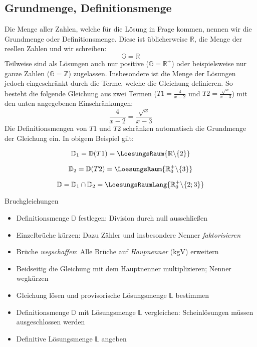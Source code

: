   
  \subsection{Grundmenge, Definitionsmenge}
  Die Menge aller Zahlen, welche für die Lösung in Frage kommen,
  nennen wir die Grundmenge oder Definitionsmenge. Diese ist üblicherweise $\mathbb{R}$, die
  Menge der reellen Zahlen und wir schreiben:
  $$\mathbb{G}=\mathbb{R}$$
  Teilweise sind als Lösungen auch nur positive ($\mathbb{G}=\mathbb{R}^+$) oder
  beispielsweise nur ganze Zahlen ($\mathbb{G}=\mathbb{Z}$)
  zugelassen.
  Insbesondere ist die Menge der Lösungen jedoch eingeschränkt durch
  die Terme, welche die Gleichung definieren. So besteht die folgende
  Gleichung aus zwei Termen ($T1=\frac{4}{x-2}$ und $T2=\frac{\sqrt{x}}{x-3}$) mit den unten angegebenen
  Einschränkungen:
  $$\frac{4}{x-2}=\frac{\sqrt{x}}{x-3}$$
  Die Definitionsmengen von $T1$ und $T2$ schränken automatisch die
  Grundmenge der Gleichung ein. In obigem Beispiel gilt:
  
  $$\mathbb{D}_1=\mathbb{D}(T1)=\LoesungsRaum{\mathbb{R}\backslash\{2\}}$$

  $$\mathbb{D}_2=\mathbb{D}(T2)=\LoesungsRaum{\mathbb{R}^+_0\backslash\{3\}}$$

  $$\mathbb{D}=\mathbb{D}_1\cap\mathbb{D}_2=\LoesungsRaumLang{\mathbb{R}^{+}_{0}\backslash\{2;3\}}$$

  \newpage
  
\begin{rezept}{Bruchgleichungen}{}
  \begin{itemize}
    \item Definitionsmenge $\mathbb{D}$ festlegen: Division durch null ausschließen
  \item Einzelbrüche kürzen: Dazu Zähler und insbesondere Nenner \textit{faktorisieren}
  \item Brüche \textit{wegschaffen}: Alle Brüche auf
    \textit{Haupnenner} (kgV) erweitern
  \item Beidseitig die Gleichung mit dem Hauptnenner
    multiplizieren; Nenner wegkürzen
  \item Gleichung lösen und provisorische Lösungsmenge $\mathbb{L}$
    bestimmen
  \item Definitionsmenge $\mathbb{D}$ mit Lösungsmenge $\mathbb{L}$
    vergleichen: Scheinlösungen müssen ausgeschlossen werden
  \item Definitive Lösungsmenge $\mathbb{L}$ angeben
    \end{itemize}
\end{rezept}

